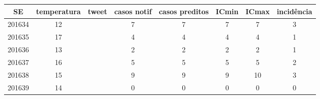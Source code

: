 \begin{tabular}{c|ccccccc}
  \hline
SE & temperatura & tweet & casos notif & casos preditos & ICmin & ICmax & incidência \\ 
  \hline
201634 & 12 &  & 7 & 7 & 7 & 7 & 3 \\ 
  201635 & 17 &  & 4 & 4 & 4 & 4 & 1 \\ 
  201636 & 13 &  & 2 & 2 & 2 & 2 & 1 \\ 
  201637 & 16 &  & 5 & 5 & 5 & 5 & 2 \\ 
  201638 & 15 &  & 9 & 9 & 9 & 10 & 3 \\ 
  201639 & 14 &  & 0 & 0 & 0 & 0 & 0 \\ 
   \hline
\end{tabular}
